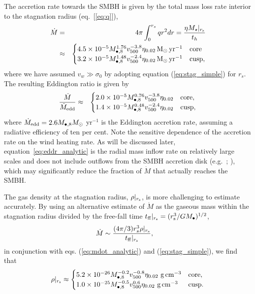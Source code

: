\documentclass[usenatbib,fleqn]{mn2e}
\newcommand{\rs}{r_s}
\newcommand{\Mbheight}{M_{\bullet,8}}
\newcommand{\pyear}{{\rm yr}^{-1}}
\renewcommand{\th}{t_h}
\newcommand{\tff}{t_{\rm ff}}
\begin{document}
The accretion rate towards the SMBH is given by the total mass loss rate interior to the stagnation radius (eq.~[\ref{eq:q}]), 
\begin{eqnarray}
  \dot{M} &=& 4\pi \int_{0}^{r_{s}}q r^{2}dr = \frac{\eta M_{\star}|_{r_{\rm s}}}{\th} \nonumber \\
&\approx&
  \begin{cases}
    4.5 \times 10^{-5} M_{\bullet,8}^{1.76}
    v_{500}^{-3.8}  \eta_{0.02} \Msun \, \pyear& \text{core} \\
    3.2 \times 10^{-5} M_{\bullet,8}^{1.48} 
    v_{500}^{-2.4}  \eta_{0.02} \Msun \, \pyear  & \text{cusp}, 
  \end{cases}
  \label{eq:mdot_analytic}
\end{eqnarray}
where we have assumed $v_{w} \gg \sigma_0$ by adopting equation
(\ref{eq:stag_simple}) for $r_s$.  The resulting Eddington ratio is
given by
\begin{eqnarray}
\frac{\dot{M}}{\dot{M}_{\rm edd}} &\approx&
  \begin{cases}
    2.0 \times 10^{-5} M_{\bullet,8}^{0.76}
    v_{500}^{-3.8}  \eta_{0.02}   & \text{core}, \\
    1.4 \times 10^{-5} \Mbheight^{0.48} 
    v_{500}^{-2.4}  \eta_{0.02}   & \text{cusp}, 
  \end{cases}
  \label{eq:eddr_analytic}
\end{eqnarray}
where $\dot{M}_{\rm edd} = 2.6M_{\bullet,8}M_{\odot}$ yr$^{-1}$ is the
Eddington accretion rate, assuming a radiative efficiency of ten per
cent.  Note the sensitive dependence of the accretion rate on the wind
heating rate.  As will be discussed later, equation~\eqref{eq:eddr_analytic} is the radial mass inflow rate on relatively large scales and does not include outflows from the SMBH accretion disk (e.g.~\citealt{Blandford&Begelman99}; \citealt{Li+13}), which may significantly reduce the fraction of $\dot{M}$ that actually reaches the SMBH.

The gas density at the stagnation radius, $\rho|_{r_{\rm s}}$, is more
challenging to estimate accurately.  By using an alternative estimate of
$\dot{M}$ as the gaseous mass within the stagnation radius divided by
the free-fall time $t_{\rm ff}|_{r_{\rm s}} = (r_{\rm
  s}^{3}/GM_{\bullet})^{1/2}$,
\begin{align}
  &\dot{M}\sim\frac{(4 \pi/3) \rs^3 \rho|_{r_{\rm s}}}{\tff|_{r_{\rm s}}},
  \label{eq:mdot_gas}
\end{align}
 in conjunction with eqs. (\ref{eq:mdot_analytic}) and (\ref{eq:stag_simple}), we find that
\begin{align}
  \rho|_{r_{\rm s}}\approx
  \begin{cases}
    5.2 \times 10^{-26} \Mbheight^{-0.2} v_{500}^{-0.8}  \eta_{0.02} \,
    \, {\rm g \, cm^{-3}}& \text{core},\\
    1.0 \times 10^{-25}  \Mbheight^{-0.5} v_{500}^{0.6}  \eta_{0.02} \,\, {\rm g \,cm^{-3}} & \text{cusp}.
  \end{cases}
  \label{eq:rhors}
\end{align}
\end{document}
